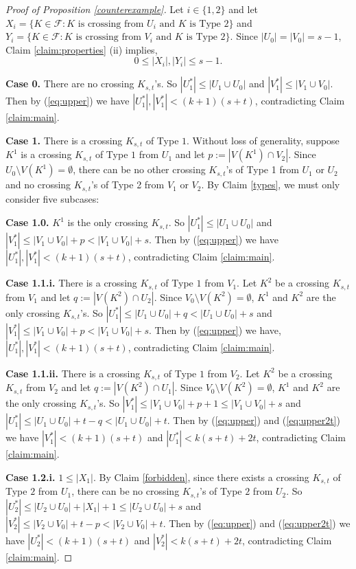 \documentclass[oneside,12pt]{memoir}
\begin{document}
\begin{proof}[Proof of Proposition \ref{counterexample}]
Let $i\in\{1,2\}$ and let $X_i=\{K\in\mathcal{F}:K \text{ is crossing from } U_i \text{ and } K \text{ is Type } 2\}$ and $Y_i=\{K\in\mathcal{F}:K \text{ is crossing from } V_i \text{ and } K \text{ is Type } 2\}$.  Since $|U_0|=|V_0|=s-1$, Claim \ref{claim:properties} (ii) implies, \begin{equation}\label{X_iY_i}0\leq|X_i|,|Y_i|\leq s-1. \end{equation}


\noindent
\textbf{Case 0.} There are no crossing $K_{s,t}$'s.  So $|U_1^*|\leq |U_1\cup U_0|$ and $|V_1^*|\leq |V_1\cup V_0|$.  Then by (\ref{eq:upper}) we have $|U_1^*|, |V_1^*|<(k+1)(s+t)$, contradicting Claim \ref{claim:main}.

\noindent
\textbf{Case 1.} There is a crossing $K_{s,t}$ of Type $1$.  Without loss of generality, suppose $K^1$ is a crossing $K_{s,t}$ of Type $1$ from $U_1$ and let $p:=|V(K^1)\cap V_2|$.  Since $U_0\setminus V(K^1)=\emptyset$, there can be no other crossing $K_{s,t}$'s of Type 1 from $U_1$ or $U_2$ and no crossing $K_{s,t}$'s of Type 2 from $V_1$ or $V_2$. By Claim \ref{types}, we must only consider five subcases:

\textbf{Case 1.0.} $K^1$ is the only crossing $K_{s,t}$. So $|U_1^*|\leq |U_1\cup U_0|$ and $|V_1^*|\leq |V_1\cup V_0|+p< |V_1\cup V_0|+s$.  Then by (\ref{eq:upper}) we have $|U_1^*|, |V_1^*|<(k+1)(s+t)$, contradicting Claim \ref{claim:main}.

\textbf{Case 1.1.i.} There is a crossing $K_{s,t}$ of Type $1$ from $V_1$. Let $K^2$ be a crossing $K_{s,t}$ from $V_1$ and let $q:=|V(K^2)\cap U_2|$.  Since $V_0\setminus V(K^2)=\emptyset$, $K^1$ and $K^2$ are the only crossing $K_{s,t}$'s.  So $|U_1^*|\leq |U_1\cup U_0|+q< |U_1\cup U_0|+s$ and $|V_1^*|\leq |V_1\cup V_0|+p< |V_1\cup V_0|+s$.  Then by (\ref{eq:upper}) we have, $|U_1^*|, |V_1^*|<(k+1)(s+t)$, contradicting Claim \ref{claim:main}.

\textbf{Case 1.1.ii.} There is a crossing $K_{s,t}$ of Type $1$ from $V_2$. Let $K^2$ be a crossing $K_{s,t}$ from $V_2$ and let $q:=|V(K^2)\cap U_1|$.  Since $V_0\setminus V(K^2)=\emptyset$, $K^1$ and $K^2$ are the only crossing $K_{s,t}$'s.  So $|V_1^*|\leq |V_1\cup V_0|+p+1\leq |V_1\cup V_0|+s$ and $|U_1^*|\leq |U_1\cup U_0|+t-q<|U_1\cup U_0|+t$.  Then by (\ref{eq:upper}) and (\ref{eq:upper2t}) we have $|V_1^*|<(k+1)(s+t)$ and $|U_1^*|<k(s+t)+2t$, contradicting Claim \ref{claim:main}.

\textbf{Case 1.2.i.} $1\leq |X_1|$. By Claim \ref{forbidden}, since there exists a crossing $K_{s,t}$ of Type $2$ from $U_1$, there can be no crossing $K_{s,t}$'s of Type $2$ from $U_2$.  So $|U_2^*|\leq |U_2\cup U_0|+|X_1|+1\leq |U_2\cup U_0|+s$ and $|V_2^*|\leq |V_2\cup V_0|+t-p<|V_2\cup V_0|+t$.  Then by (\ref{eq:upper}) and (\ref{eq:upper2t}) we have $|U_2^*|<(k+1)(s+t)$ and $|V_2^*|<k(s+t)+2t$, contradicting Claim \ref{claim:main}.


\end{proof}
\end{document}

